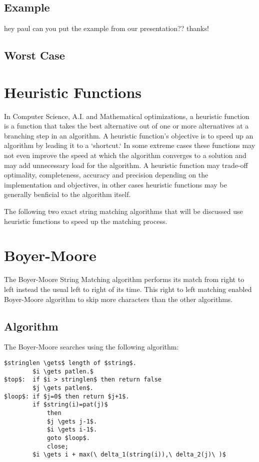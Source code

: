 \subsection{Example}
hey paul can you put the example from our presentation?? thanks!
\subsection{Worst Case}    
\section{Heuristic Functions}
In Computer Science, A.I. and Mathematical optimizations, a heuristic function is a function that takes the best alternative out of one or more alternatives at a branching step in an algorithm. A heuristic function's objective is to speed up an algorithm by leading it to a `shortcut.` In some extreme cases these functions may not even improve the speed at which the algorithm converges to a solution and may add unnecessary load for the algorithm. A heuristic function may trade-off optimality, completeness, accuracy and precision depending on the implementation and objectives, in other cases heuristic functions may be generally benficial to the algorithm itself.

The following two exact string matching algorithms that will be discussed use heuristic functions to speed up the matching process.
\section{Boyer-Moore}
The Boyer-Moore String Matching algorithm performs its match from right to left instead the usual left to right of its time. This right to left matching enabled Boyer-Moore algorithm to skip more characters than the other algorithms.

\subsection{Algorithm}
The Boyer-Moore searches using the following algorithm:
\begin{lstlisting}[mathescape=true]
		$stringlen \gets$ length of $string$.
		$i \gets patlen.$
$top$:	if $i > stringlen$ then return false
		$j \gets patlen$.
$loop$:	if $j=0$ then return $j+1$.
		if $string(i)=pat(j)$
			then
			$j \gets j-1$.
			$i \gets i-1$.
			goto $loop$.
			close;
		$i \gets i + max(\ delta_1(string(i)),\ delta_2(j)\ )$
\end{lstlisting}

